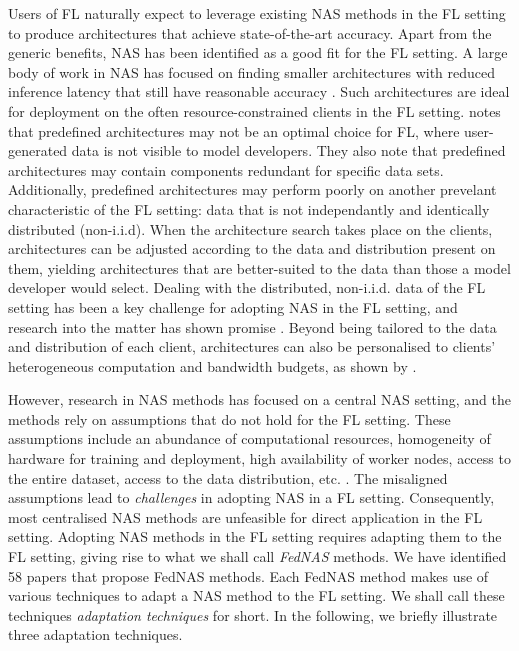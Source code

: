 Users of FL naturally expect to leverage existing NAS methods in the FL setting to produce architectures that achieve state-of-the-art accuracy. Apart from the generic benefits, NAS has been identified as a good fit for the FL setting. A large body of work in NAS has focused on finding smaller architectures with reduced inference latency that still have reasonable accuracy \cite{nas_1000_papers_2023}. Such architectures are ideal for deployment on the often resource-constrained clients in the FL setting. \cite{fl_advances_and_open_problems_2021} notes that predefined architectures may not be an optimal choice for FL, where user-generated data is not visible to model developers. They also note that predefined architectures may contain components redundant for specific data sets. Additionally, predefined architectures may perform poorly on another prevelant characteristic of the FL setting: data that is not independantly and identically distributed (non-i.i.d). When the architecture search takes place on the clients, architectures can be adjusted according to the data and distribution present on them, yielding architectures that are better-suited to the data than those a model developer would select. Dealing with the distributed, non-i.i.d. data of the FL setting has been a key challenge for adopting NAS in the FL setting, and research into the matter has shown promise \cite{fednas_2021} \cite{rl_fednas_2021} \cite{fedoras_2022} \cite{finch_2024} \cite{peaches_2024}. Beyond being tailored to the data and distribution of each client, architectures can also be personalised to clients' heterogeneous computation and bandwidth budgets, as shown by \cite{superfednas_2024} \cite{fedoras_2022} \cite{perfedrlnas_2024} \cite{decnas_2022}.

However, research in NAS methods has focused on a central NAS setting, and the methods rely on assumptions that do not hold for the FL setting. These assumptions include an abundance of computational resources, homogeneity of hardware for training and deployment, high availability of worker nodes, access to the entire dataset, access to the data distribution, etc. \cite{fl_advances_and_open_problems_2021}. The misaligned assumptions lead to \textit{challenges} in adopting NAS in a FL setting. Consequently, most centralised NAS methods are unfeasible for direct application in the FL setting. Adopting NAS methods in the FL setting requires adapting them to the FL setting, giving rise to what we shall call \textit{FedNAS} methods. We have identified 58 papers that propose FedNAS methods. Each FedNAS method makes use of various techniques to adapt a NAS method to the FL setting. We shall call these techniques \textit{adaptation techniques} for short. In the following, we briefly illustrate three adaptation techniques. 

